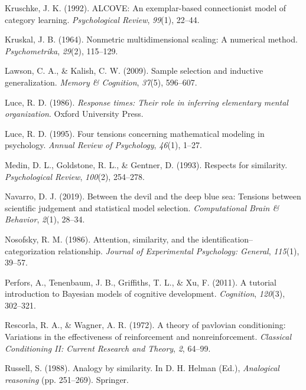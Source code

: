 \documentclass[
  english,
  doc]{apa6}
\begin{document}
\leavevmode\hypertarget{ref-kruschke1992alcove}{}%
Kruschke, J. K. (1992). ALCOVE: An exemplar-based connectionist model of category learning. \emph{Psychological Review}, \emph{99}(1), 22--44.

\leavevmode\hypertarget{ref-kruskal1964nonmetric}{}%
Kruskal, J. B. (1964). Nonmetric multidimensional scaling: A numerical method. \emph{Psychometrika}, \emph{29}(2), 115--129.

\leavevmode\hypertarget{ref-lawson2009sample}{}%
Lawson, C. A., \& Kalish, C. W. (2009). Sample selection and inductive generalization. \emph{Memory \& Cognition}, \emph{37}(5), 596--607.

\leavevmode\hypertarget{ref-luce1986response}{}%
Luce, R. D. (1986). \emph{Response times: Their role in inferring elementary mental organization}. Oxford University Press.

\leavevmode\hypertarget{ref-luce1995four}{}%
Luce, R. D. (1995). Four tensions concerning mathematical modeling in psychology. \emph{Annual Review of Psychology}, \emph{46}(1), 1--27.

\leavevmode\hypertarget{ref-medin1993respects}{}%
Medin, D. L., Goldstone, R. L., \& Gentner, D. (1993). Respects for similarity. \emph{Psychological Review}, \emph{100}(2), 254--278.

\leavevmode\hypertarget{ref-navarro2019between}{}%
Navarro, D. J. (2019). Between the devil and the deep blue sea: Tensions between scientific judgement and statistical model selection. \emph{Computational Brain \& Behavior}, \emph{2}(1), 28--34.

\leavevmode\hypertarget{ref-nosofsky1986attention}{}%
Nosofsky, R. M. (1986). Attention, similarity, and the identification--categorization relationship. \emph{Journal of Experimental Psychology: General}, \emph{115}(1), 39--57.

\leavevmode\hypertarget{ref-perfors2011tutorial}{}%
Perfors, A., Tenenbaum, J. B., Griffiths, T. L., \& Xu, F. (2011). A tutorial introduction to Bayesian models of cognitive development. \emph{Cognition}, \emph{120}(3), 302--321.

\leavevmode\hypertarget{ref-rescorla1972theory}{}%
Rescorla, R. A., \& Wagner, A. R. (1972). A theory of pavlovian conditioning: Variations in the effectiveness of reinforcement and nonreinforcement. \emph{Classical Conditioning II: Current Research and Theory}, \emph{2}, 64--99.

\leavevmode\hypertarget{ref-russell1988analogy}{}%
Russell, S. (1988). Analogy by similarity. In D. H. Helman (Ed.), \emph{Analogical reasoning} (pp. 251--269). Springer.
\end{document}
